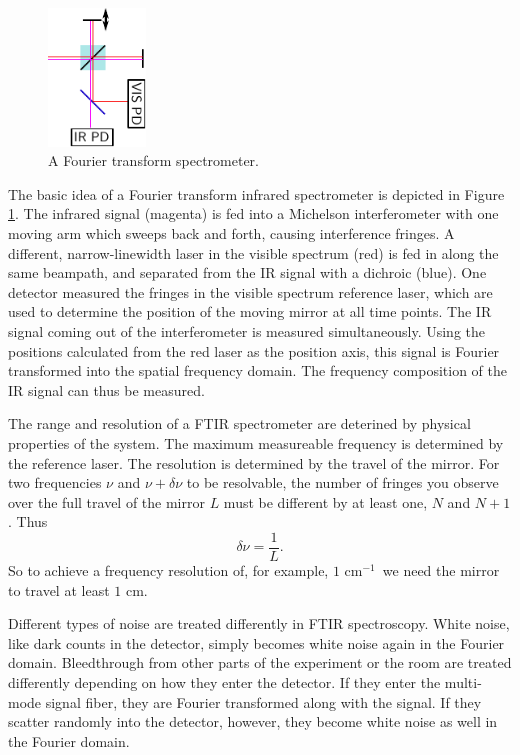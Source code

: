 \documentclass[12pt]{puthesis}
\newcommand{\wn}{cm$^{-1}$}
\begin{document}
\begin{figure}
  \centering
  \includegraphics[width=0.23\textwidth]{FTIRMainIdea}
  \caption{A Fourier transform spectrometer.}
  \label{fig:ftirmainidea}
\end{figure}

The basic idea of a Fourier transform infrared spectrometer is depicted in Figure \ref{fig:ftirmainidea}. The infrared signal (magenta) is fed into a Michelson interferometer with one moving arm which sweeps back and forth, causing interference fringes. A different, narrow-linewidth laser in the visible spectrum (red) is fed in along the same beampath, and separated from the IR signal with a dichroic (blue). One detector measured the fringes in the visible spectrum reference laser, which are used to determine the position of the moving mirror at all time points. The IR signal coming out of the interferometer is measured simultaneously. Using the positions calculated from the red laser as the position axis, this signal is Fourier transformed into the spatial frequency domain. The frequency composition of the IR signal can thus be measured. 

The range and resolution of a FTIR spectrometer are deterined by physical properties of the system. The maximum measureable frequency is determined by the reference laser. The resolution is determined by the travel of the mirror. For two frequencies $\nu$ and $\nu+\delta\nu$ to be resolvable, the number of fringes you observe over the full travel of the mirror $L$ must be different by at least one, $N$ and $N+1$. Thus 
\begin{equation}\label{eq:9}
\delta \nu = \frac{1}{L}.
\end{equation}
So to achieve a frequency resolution of, for example, $1$ \wn\ we need the mirror to travel at least $1$ cm.

Different types of noise are treated differently in FTIR spectroscopy. White noise, like dark counts in the detector, simply becomes white noise again in the Fourier domain. Bleedthrough from other parts of the experiment or the room are treated differently depending on how they enter the detector. If they enter the multi-mode signal fiber, they are Fourier transformed along with the signal. If they scatter randomly into the detector, however, they become white noise as well in the Fourier domain.
\end{document}
